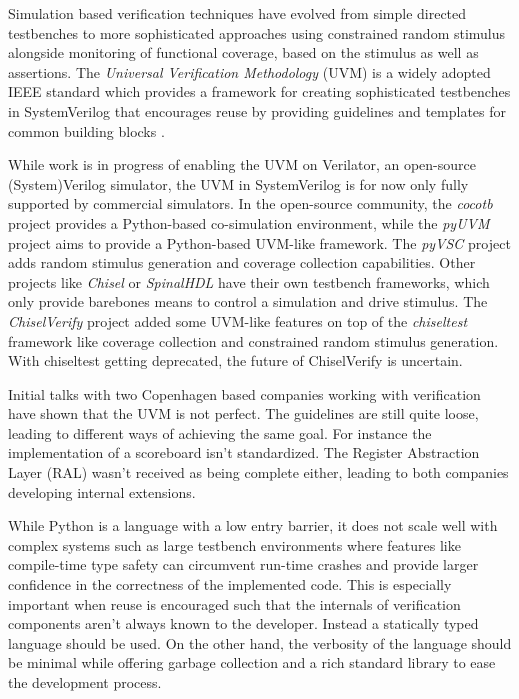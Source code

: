 \documentclass[conference]{IEEEtran}
\begin{document}
Simulation based verification techniques have evolved from simple directed testbenches to more sophisticated approaches using constrained random stimulus alongside monitoring of functional coverage, based on the stimulus as well as assertions. 
The \textit{Universal Verification Methodology} (UVM) is a widely adopted IEEE standard which provides a framework for creating sophisticated testbenches in SystemVerilog that encourages reuse by providing guidelines and templates for common building blocks \cite{flake2020a}. 

While work is in progress of enabling the UVM on Verilator, an open-source (System)Verilog simulator, the UVM in SystemVerilog is for now only fully supported by commercial simulators.
In the open-source community, the \textit{cocotb} project provides a Python-based co-simulation environment, while the \textit{pyUVM} project aims to provide a Python-based UVM-like framework. The \textit{pyVSC} project adds random stimulus generation and coverage collection capabilities. Other projects like \textit{Chisel} or \textit{SpinalHDL} have their own testbench frameworks, which only provide barebones means to control a simulation and drive stimulus. The \textit{ChiselVerify} project added some UVM-like features on top of the \textit{chiseltest} framework like coverage collection and constrained random stimulus generation. With chiseltest getting deprecated, the future of ChiselVerify is uncertain.

Initial talks with two Copenhagen based companies working with verification have shown that the UVM is not perfect. The guidelines are still quite loose, leading to different ways of achieving the same goal. For instance the implementation of a scoreboard isn't standardized. The Register Abstraction Layer (RAL) wasn't received as being complete either, leading to both companies developing internal extensions.

While Python is a language with a low entry barrier, it does not scale well with complex systems such as large testbench environments where features like compile-time type safety can circumvent run-time crashes and provide larger confidence in the correctness of the implemented code. This is especially important when reuse is encouraged such that the internals of verification components aren't always known to the developer. Instead a statically typed language should be used. On the other hand, the verbosity of the language should be minimal while offering garbage collection and a rich standard library to ease the development process. 
\end{document}
